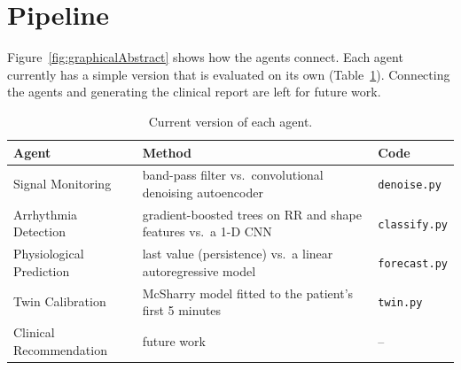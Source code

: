 \section{Pipeline}
\label{section:pipeline}

Figure~\ref{fig:graphicalAbstract} shows how the agents connect. Each agent currently has a simple version that is evaluated on its own (Table~\ref{tab:pipeline}). Connecting the agents and generating the clinical report are left for future work.

\begin{table}[H]
\caption{Current version of each agent.}
\label{tab:pipeline}
\centering
\small
{}
\begin{tabularx}{\textwidth}{@{}>{\raggedright\arraybackslash}p{3.6cm}>{\raggedright\arraybackslash}X>{\raggedright\arraybackslash}p{3.6cm}@{}}
\toprule
\textbf{Agent} & \textbf{Method} & \textbf{Code} \\
\midrule
Signal Monitoring & band-pass filter vs.\ convolutional denoising autoencoder & \texttt{denoise.py} \\
Arrhythmia Detection & gradient-boosted trees on RR and shape features vs.\ a 1-D CNN & \texttt{classify.py} \\
Physiological Prediction & last value (persistence) vs.\ a linear autoregressive model & \texttt{forecast.py} \\
Twin Calibration & McSharry model fitted to the patient's first 5 minutes & \texttt{twin.py} \\
Clinical Recommendation & future work & -- \\
\bottomrule
\end{tabularx}
\end{table}
